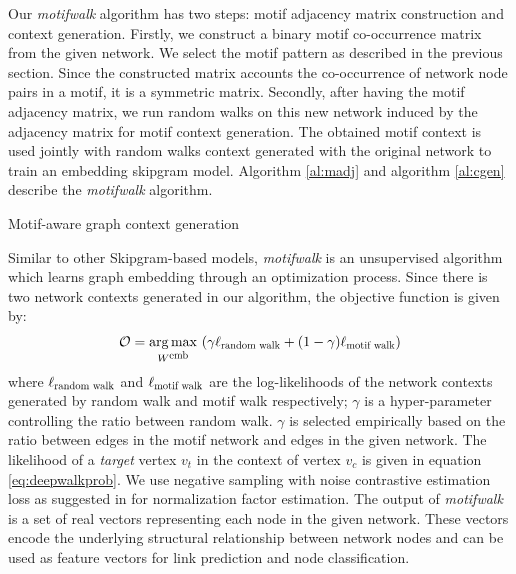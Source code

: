 \documentclass{article}
\DeclareMathOperator*{\argmax}{arg\,max}
\theoremstyle{definition}
\begin{document}
Our \emph{motifwalk} algorithm has two steps: motif adjacency matrix
construction and context generation. Firstly, we construct a binary
motif co-occurrence matrix from the given network. We select the motif
pattern as described in the previous section. Since the constructed matrix 
accounts the co-occurrence of network node pairs in a motif, it is a 
symmetric matrix. Secondly, after having the motif adjacency matrix, 
we run random walks on this new network induced by the adjacency matrix
for motif context generation. The obtained motif context is used jointly 
with random walks context generated with the original network to train an 
embedding skipgram model. Algorithm \ref{al:madj} and algorithm 
\ref{al:cgen} describe the \emph{motifwalk} algorithm.
\begin{algorithm}[h] \label{al:cgen}
\caption{Motif-aware graph context generation}
\end{algorithm}

Similar to other Skipgram-based models, \emph{motifwalk} is an unsupervised
algorithm which learns graph embedding through an optimization process. 
Since there is two network contexts generated in our algorithm, the 
objective function is given by:
\begin{equation} 
\begin{aligned}
&\mathcal{O} = \argmax_{W^{\scalebox{0.75}{emb}}}\ (\gamma 
\ell_{\scalebox{0.75}{random walk}} + (1-\gamma) \ell_{\scalebox{0.75}
{motif walk}}) \\
\end{aligned}
\label{eq:mloss}
\end{equation}
where $\ell_{\scalebox{0.75}{random walk}}$ and $\ell_{\scalebox{0.75}
{motif walk}}$
are the log-likelihoods of the network contexts generated by
random walk and motif walk respectively; $\gamma$ is a hyper-parameter
controlling the ratio between random walk. $\gamma$ is selected 
empirically based on the ratio between edges in the motif network and edges
in the given network. The likelihood
of a \emph{target} vertex $v_t$ in the context of vertex $v_c$ is given
in equation \ref{eq:deepwalkprob}. We use negative sampling with noise
contrastive estimation loss as suggested in \cite{skipgram} for normalization
factor estimation. The output of \emph{motifwalk} is a set of real 
vectors representing each node in the given network. These vectors encode 
the underlying structural relationship between network nodes and can be used as 
feature vectors for link prediction and node classification.
\end{document}

